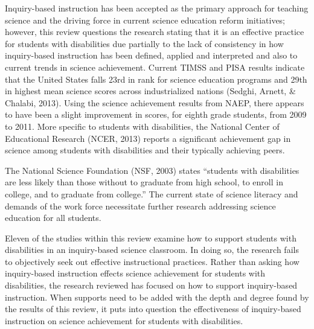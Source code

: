\documentclass[11.5pt]{sig-alternate} %
\begin{document}
\begin{large}
Inquiry-based instruction has been accepted as the primary approach for teaching science and the driving force in current science education reform initiatives; however, this review questions the research stating that it is an effective practice for students with disabilities due partially to the lack of consistency in how inquiry-based instruction has been defined, applied and interpreted and also to current trends in science achievement.  Current TIMSS and PISA results indicate that the United States falls 23rd in rank for science education programs and 29th in highest mean science scores across industrialized nations (Sedghi, Arnett, \& Chalabi, 2013).   Using the science achievement results from NAEP, there appears to have been a slight improvement in scores, for eighth grade students, from 2009 to 2011.  More specific to students with disabilities, the National Center of Educational Research (NCER, 2013) reports a significant achievement gap in science among students with disabilities and their typically achieving peers.

The National Science Foundation (NSF, 2003) states “students with disabilities are less likely than those without to graduate from high school, to enroll in college, and to graduate from college.”  The current state of science literacy and demands of the work force necessitate further research addressing science education for all students.

Eleven of the studies within this review examine how to support students with disabilities in an inquiry-based science classroom.  In doing so, the research fails to objectively seek out effective instructional practices.  Rather than asking how inquiry-based instruction effects science achievement for students with disabilities, the research reviewed has focused on how to support inquiry-based instruction.  When supports need to be added with the depth and degree found by the results of this review, it puts into question the effectiveness of inquiry-based instruction on science achievement for students with disabilities.  


\end{large}
\end{document}
